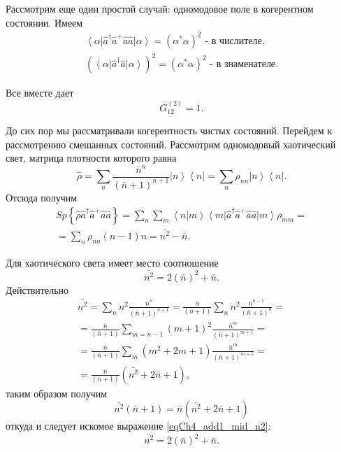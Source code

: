 Рассмотрим еще один простой случай: одномодовое поле в когерентном состоянии. Имеем
\begin{eqnarray}
\left<\alpha\right|\hat{a}^{\dag}\hat{a}^{+}\hat{a}\hat{a}\left|\alpha\right>
= \left(\alpha^{*}\alpha\right)^2
\mbox{ - в числителе},
\nonumber \\
\left(\left<\alpha\right|\hat{a}^{\dag}\hat{a}\left|\alpha\right>\right)^2
= \left(\alpha^{*}\alpha\right)^2
\mbox{ - в знаменателе}.
\nonumber
\end{eqnarray}

Все вместе дает
\[
G^{(2)}_{12} = 1.
\]

До сих пор мы рассматривали когерентность чистых состояний. Перейдем к
рассмотрению смешанных состояний. Рассмотрим одномодовый хаотический
свет, матрица плотности  которого равна 
\[
\hat{\rho} = \sum_{n}\frac{\bar{n}^n}{\left(\bar{n} + 1\right)^{n +
    1}} \left|n\right>\left<n\right| = 
\sum_n\rho_{nn}\left|n\right>\left<n\right|.
\]
Отсюда получим
\begin{eqnarray}
Sp \left\{\hat{\rho}\hat{a}^{\dag}\hat{a}^{+}\hat{a}\hat{a}\right\} = 
\sum_{n}\sum_{m}\left<n\right|\left.m\right>\left<m\right|
\hat{a}^{\dag}\hat{a}^{+}\hat{a}\hat{a}
\left|m\right> \rho_{mm} = 
\nonumber \\
= \sum_{n}\rho_{nn}\left(n - 1\right)n = \bar{n^2} - \bar{n}.
\label{eqCh4_add1_sp}
\end{eqnarray}

Для хаотического света имеет место соотношение
\begin{equation}
\bar{n^2} = 2
\left(\bar{n}\right)^2 + \bar{n}.
\label{eqCh4_add1_mid_n2}
\end{equation}
Действительно
\begin{eqnarray}
\bar{n^2} = 
\sum_n n^2 \frac{\bar{n}^n}{\left(\bar{n} + 1\right)^{n + 1}} = 
\frac{\bar{n}}{\left(\bar{n} + 1\right)}\sum_n n^2
\frac{\bar{n}^{n-1}}{\left(\bar{n} + 1\right)^{n}} =
\nonumber \\
= 
\frac{\bar{n}}{\left(\bar{n} + 1\right)}\sum_{m = n -1} \left(m +
1\right)^2
\frac{\bar{n}^m}{\left(\bar{n} + 1\right)^{m + 1}} = 
\nonumber \\
= \frac{\bar{n}}{\left(\bar{n} + 1\right)}\sum_m
\left(m^2 + 2 m + 1\right)
\frac{\bar{n}^m}{\left(\bar{n} + 1\right)^{m + 1}} = 
\nonumber \\
=
\frac{\bar{n}}{\left(\bar{n} + 1\right)}\left(\bar{n^2} + 2 \bar{n} +
1\right),
\nonumber
\end{eqnarray}
таким образом получим
\begin{equation}
\bar{n^2}\left(\bar{n} + 1\right) = 
\bar{n}\left(\bar{n^2} + 2 \bar{n} + 1\right)
\nonumber
\end{equation}
откуда и следует искомое выражение \eqref{eqCh4_add1_mid_n2}:
\begin{equation}
\bar{n^2} = 2
\left(\bar{n}\right)^2 + \bar{n}.
\nonumber
\end{equation}

